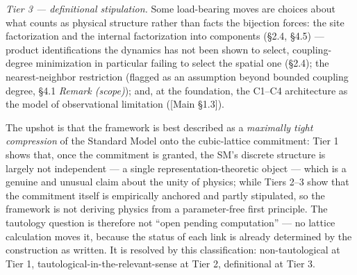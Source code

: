 \documentclass[
]{article}
\begin{document}
\emph{Tier 3 --- definitional stipulation.} Some load-bearing moves are
choices about what counts as physical structure rather than facts the
bijection forces: the site factorization and the internal factorization
into components (§2.4, §4.5) --- product identifications the dynamics
has not been shown to select, coupling-degree minimization in particular
failing to select the spatial one (§2.4); the nearest-neighbor
restriction (flagged as an assumption beyond bounded coupling degree,
§4.1 \emph{Remark (scope)}); and, at the foundation, the C1--C4
architecture as the model of observational limitation ({[}Main §1.3{]}).

The upshot is that the framework is best described as a \emph{maximally
tight compression} of the Standard Model onto the cubic-lattice
commitment: Tier 1 shows that, once the commitment is granted, the SM's
discrete structure is largely not independent --- a single
representation-theoretic object --- which is a genuine and unusual claim
about the unity of physics; while Tiers 2--3 show that the commitment
itself is empirically anchored and partly stipulated, so the framework
is not deriving physics from a parameter-free first principle. The
tautology question is therefore not ``open pending computation'' --- no
lattice calculation moves it, because the status of each link is already
determined by the construction as written. It is resolved by this
classification: non-tautological at Tier 1,
tautological-in-the-relevant-sense at Tier 2, definitional at Tier 3.
\end{document}
